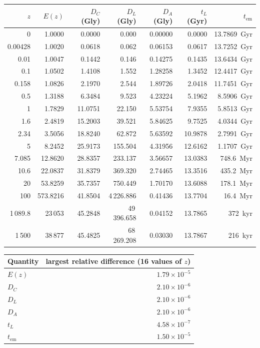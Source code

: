 \begin{center}
\footnotesize
\renewcommand{\arraystretch}{1.15}
\begin{tabular}{rrrrrrr}
\toprule
$z$ & $E(z)$ & $D_{C}$ (Gly) & $D_{L}$ (Gly) & $D_{A}$ (Gly)
& $t_{L}$ (Gyr) & $t_{\text{em}}$ \\
\midrule
0 & 1.0000 & 0.0000 & 0.000 & 0.00000 & 0.0000 & 13.7869~Gyr \\
0.00428 & 1.0020 & 0.0618 & 0.062 & 0.06153 & 0.0617 & 13.7252~Gyr \\
0.01 & 1.0047 & 0.1442 & 0.146 & 0.14275 & 0.1435 & 13.6434~Gyr \\
0.1 & 1.0502 & 1.4108 & 1.552 & 1.28258 & 1.3452 & 12.4417~Gyr \\
0.158 & 1.0826 & 2.1970 & 2.544 & 1.89726 & 2.0418 & 11.7451~Gyr \\
0.5 & 1.3188 & 6.3484 & 9.523 & 4.23224 & 5.1962 & 8.5906~Gyr \\
1 & 1.7829 & 11.0751 & 22.150 & 5.53754 & 7.9355 & 5.8513~Gyr \\
1.6 & 2.4819 & 15.2003 & 39.521 & 5.84625 & 9.7525 & 4.0344~Gyr \\
2.34 & 3.5056 & 18.8240 & 62.872 & 5.63592 & 10.9878 & 2.7991~Gyr \\
5 & 8.2452 & 25.9173 & 155.504 & 4.31956 & 12.6162 & 1.1707~Gyr \\
7.085 & 12.8620 & 28.8357 & 233.137 & 3.56657 & 13.0383 & 748.6~Myr \\
10.6 & 22.0837 & 31.8379 & 369.320 & 2.74465 & 13.3516 & 435.2~Myr \\
20 & 53.8259 & 35.7357 & 750.449 & 1.70170 & 13.6088 & 178.1~Myr \\
100 & 573.8216 & 41.8504 & 4\,226.886 & 0.41436 & 13.7704 & 16.4~Myr \\
1\,089.8 & 23\,053 & 45.2848 & 49\,396.658 & 0.04152 & 13.7865 & 372~kyr \\
1\,500 & 38\,877 & 45.4825 & 68\,269.208 & 0.03030 & 13.7867 & 216~kyr \\
\bottomrule
\end{tabular}
\end{center}

\begin{center}
\renewcommand{\arraystretch}{1.25}
\begin{tabular}{lr}
\toprule
\textbf{Quantity} & \textbf{largest relative difference (16 values of $z$)} \\
\midrule
$E(z)$ & $1.79 \times 10^{-5}$ \\
$D_{C}$ & $2.10 \times 10^{-6}$ \\
$D_{L}$ & $2.10 \times 10^{-6}$ \\
$D_{A}$ & $2.10 \times 10^{-6}$ \\
$t_{L}$ & $4.58 \times 10^{-7}$ \\
$t_{\text{em}}$ & $1.50 \times 10^{-5}$ \\
\bottomrule
\end{tabular}
\end{center}
